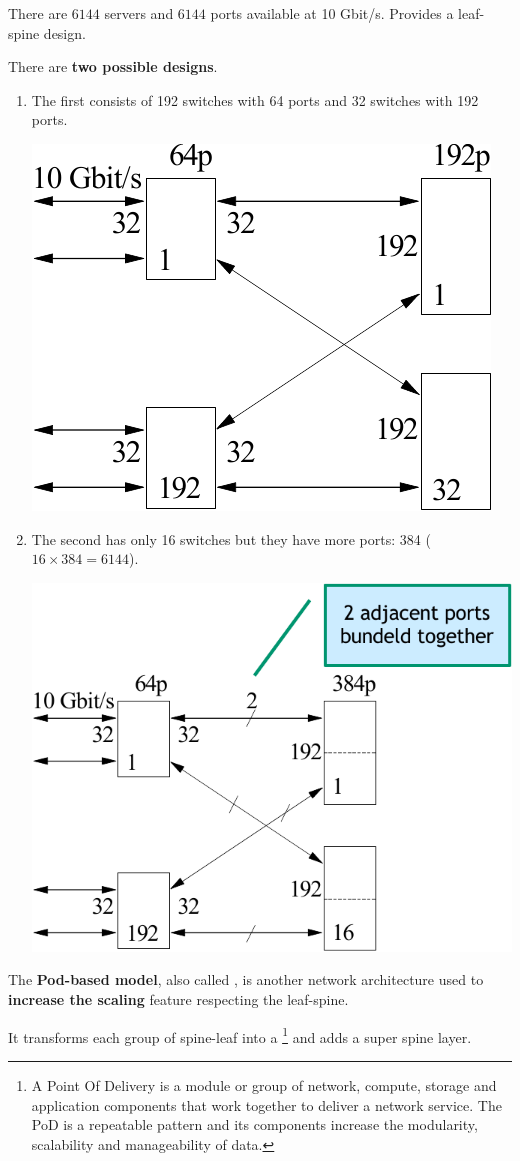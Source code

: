 \begin{examplebox}
    There are $6144$ servers and $6144$ ports available at 10 Gbit/s. Provides a leaf-spine design.

    There are \textbf{two possible designs}.
    \begin{enumerate}
        \item The first consists of 192 switches with 64 ports and 32 switches with 192 ports.
        \begin{center}
            \includegraphics[width=.4\textwidth]{img/networking-8.pdf}
        \end{center}
        
        \item The second has only 16 switches but they have more ports: 384 ($16 \times 384 = 6144$).
        \begin{center}
            \includegraphics[width=.5\textwidth]{img/networking-9.pdf}
        \end{center}
    \end{enumerate}
\end{examplebox}

\noindent
The \textbf{Pod-based model}, also called , is another network architecture used to \textbf{increase the scaling} feature respecting the leaf-spine.

\highspace
It transforms each group of spine-leaf into a \footnote{A Point Of Delivery is a module or group of network, compute, storage and application components that work together to deliver a network service. The PoD is a repeatable pattern and its components increase the modularity, scalability and manageability of data.} and adds a super spine layer.

